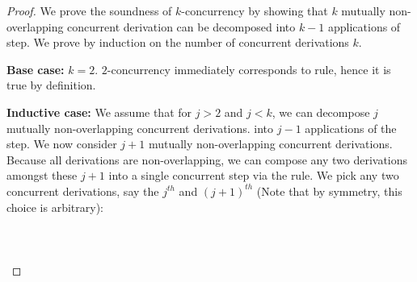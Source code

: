 \documentclass{tlp}
\begin{document}
\begin{proof}
  We prove the soundness of $k$-concurrency by showing that $k$ mutually non-overlapping 
  concurrent derivation can be decomposed into $k-1$ applications of  
  step. We prove by induction on the number of concurrent derivations $k$.
  
  {\bf Base case:} $k=2$. $2$-concurrency immediately corresponds to 
  rule, hence it is true by definition.
  
  {\bf Inductive case:} We assume that for $j>2$ and $j<k$, we can decompose $j$ mutually 
  non-overlapping concurrent derivations. into $j-1$ applications of the  step. 
  We now consider $j+1$ mutually non-overlapping concurrent derivations. Because all derivations are
  non-overlapping, we can compose any two derivations amongst these $j+1$ into a single concurrent 
  step via the  rule. We pick any two concurrent derivations, say the $j^{th}$ 
  and $(j+1)^{th}$ (Note that by symmetry, this choice is arbitrary):
  {\small
    \\ \\
   
    \\ \\
   
}
\end{proof}
\end{document}
